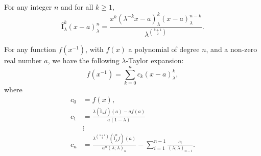 \documentclass[10pt,a4paper]{amsart}
\newcommand{\I}{\widehat{\mathrm{I}}}
\begin{document}
\begin{proposition}\label{prop_intk_binom}
For any integer $n$ and for all $k\geq1$,
    \begin{equation}
        \I_{\lambda}^k(x-a)_{\lambda}^n=\frac{x^k(\lambda^{-k}x-a)_{\lambda}^{k}(x-a)_{\lambda}^{n-k}}{\lambda^{\binom{k+1}{2}}}.
    \end{equation}
\end{proposition}

\begin{theorem}
For any function $f(x^{-1})$, with $f(x)$ a polynomial of degree $n$, and a non-zero real number $a$, we have the following $\lambda$-Taylor expansion:
\begin{equation}
    f(x^{-1})=\sum_{k=0}^{n}c_{k}(x-a)_{\lambda}^{k},
\end{equation}
where
\begin{align*}
    c_{0}&=f(x),\\
    c_{1}&=\frac{\lambda(\I_{\lambda}f)(a)-af(a)}{a(1-\lambda)}\\
    &\vdots\\
    c_{n}&=\frac{\lambda^{\binom{n+1}{2}}(\I_{\lambda}^{n}f)(a)}{a^n(\lambda;\lambda)_{n}}-\sum_{i=1}^{n-1}\frac{c_{i}}{(\lambda;\lambda)_{n-i}}.
\end{align*}
\end{theorem}
\end{document}
